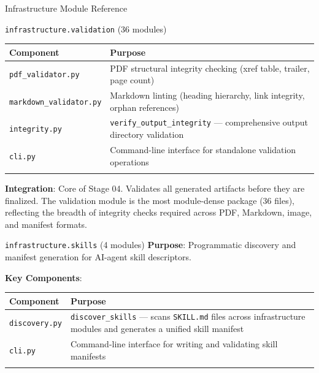 \documentclass[
  ignorenonframetext,
]{beamer}
\newcounter{none} %
\begin{document}
\begin{frame}[fragile]{Infrastructure Module Reference}
\begin{block}{\texttt{infrastructure.validation} (36 modules)}
{\def\LTcaptype{none} %
\begin{longtable}[]{@{}
  >{\raggedright\arraybackslash}p{}
  >{\raggedright\arraybackslash}p{}@{}}
\toprule\noalign{}
\begin{minipage}[b]{\linewidth}\raggedright
Component
\end{minipage} & \begin{minipage}[b]{\linewidth}\raggedright
Purpose
\end{minipage} \\
\midrule\noalign{}
\endhead
\texttt{pdf\_validator.py} & PDF structural integrity checking (xref
table, trailer, page count) \\
\texttt{markdown\_validator.py} & Markdown linting (heading hierarchy,
link integrity, orphan references) \\
\texttt{integrity.py} & \texttt{verify\_output\_integrity} ---
comprehensive output directory validation \\
\texttt{cli.py} & Command-line interface for standalone validation
operations \\
\bottomrule\noalign{}
\end{longtable}
}

\textbf{Integration}: Core of Stage 04. Validates all generated
artifacts before they are finalized. The validation module is the most
module-dense package (36 files), reflecting the breadth of integrity
checks required across PDF, Markdown, image, and manifest formats.
\end{block}

\begin{block}{\texttt{infrastructure.skills} (4 modules)}
\protect{}\label{infrastructure.skills-4-modules}
\textbf{Purpose}: Programmatic discovery and manifest generation for
AI-agent skill descriptors.

\textbf{Key Components}:

{\def\LTcaptype{none} %
\begin{longtable}[]{@{}
  >{\raggedright\arraybackslash}p{}
  >{\raggedright\arraybackslash}p{}@{}}
\toprule\noalign{}
\begin{minipage}[b]{\linewidth}\raggedright
Component
\end{minipage} & \begin{minipage}[b]{\linewidth}\raggedright
Purpose
\end{minipage} \\
\midrule\noalign{}
\endhead
\texttt{discovery.py} & \texttt{discover\_skills} --- scans
\texttt{SKILL.md} files across infrastructure modules and generates a
unified skill manifest \\
\texttt{cli.py} & Command-line interface for writing and validating
skill manifests \\
\bottomrule\noalign{}
\end{longtable}
}


\end{block}
\end{frame}
\end{document}
